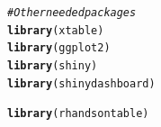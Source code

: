 \documentclass{article}\usepackage[]{graphicx}\usepackage[]{color}
\makeatletter
\newcommand{\hlcom}[1]{\textcolor[rgb]{0.678,0.584,0.686}{\textit{#1}}}%
\newcommand{\hlstd}[1]{\textcolor[rgb]{0.345,0.345,0.345}{#1}}%
\newcommand{\hlkwd}[1]{\textcolor[rgb]{0.737,0.353,0.396}{\textbf{#1}}}%
\newenvironment{kframe}{%
 \def\at@end@of@kframe{}%
 \ifinner\ifhmode%
  \def\at@end@of@kframe{\end{minipage}}%
  \begin{minipage}{\columnwidth}%
 \fi\fi%
 \def\FrameCommand##1{\hskip\@totalleftmargin \hskip-\fboxsep
 \colorbox{shadecolor}{##1}\hskip-\fboxsep
     \hskip-\linewidth \hskip-\@totalleftmargin \hskip\columnwidth}%
 \MakeFramed {\advance\hsize-\width
   \@totalleftmargin\z@ \linewidth\hsize
   \@setminipage}}%
 {\par\unskip\endMakeFramed%
 \at@end@of@kframe}
\newenvironment{knitrout}{}{} %
\makeatother
\begin{document}
\begin{knitrout}
\color{fgcolor}\begin{kframe}
\begin{alltt}
\hlcom{# Other needed packages}
\hlkwd{library}\hlstd{(xtable)}
\hlkwd{library}\hlstd{(ggplot2)}
\hlkwd{library}\hlstd{(shiny)}
\hlkwd{library}\hlstd{(shinydashboard)}
\end{alltt}


{\ttfamily\noindent\itshape\color{messagecolor}{\#\# \\\#\# Attaching package: 'shinydashboard'}}

{\ttfamily\noindent\itshape\color{messagecolor}{\#\# The following object is masked from 'package:graphics':\\\#\# \\\#\#\ \ \ \  box}}\begin{alltt}
\hlkwd{library}\hlstd{(rhandsontable)}
\end{alltt}
\end{kframe}
\end{knitrout}



\end{document}
